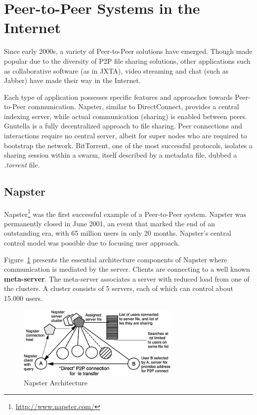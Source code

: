 \section{Peer-to-Peer Systems in the Internet}
\label{sec:p2p-systems:p2p-internet}

Since early 2000s, a variety of
Peer-to-Peer solutions have emerged. Though made popular due to the diversity
of P2P file sharing solutions, other applications such as collaborative
software (as in JXTA), video streaming and chat (such as Jabber) have made
their way in the Internet.

Each type of application possesses specific features and approaches towards
Peer-to-Peer communication. Napster, similar to DirectConnect, provides a
central indexing server, while actual communication (sharing) is enabled
between peers. Gnutella is a fully decentralized approach to file sharing.
Peer connections and interactions require no central server, albeit for super
nodes who are required to bootstrap the network. BitTorrent, one of the most
successful protocols, isolates a sharing session within a swarm, itself
described by a metadata file, dubbed a \textit{.torrent} file.

\subsection{Napster}

Napster\footnote{\url{http://www.napster.com/}} was the first successful example of a Peer-to-Peer
system. Napster was permanently closed in June 2001, an event that marked the
end of an outstanding era, with 65 million users in only 20 months. Napster's
central control model was possible due to focusing user approach.

Figure~\ref{fig:p2p-systems:napster} presents the essential architecture
components of Napster where communication is mediated by the server. Clients
are connecting to a well known \textbf{meta-server}. The meta-server
associates a server with reduced load from one of the clusters. A cluster
consists of 5 servers, each of which can control about 15.000 users.

\begin{figure}
  \centering
  \includegraphics[width=0.7\textwidth]{src/img/p2p-systems/napster}
  \caption{Napster Architecture}
  \label{fig:p2p-systems:napster}
\end{figure}

